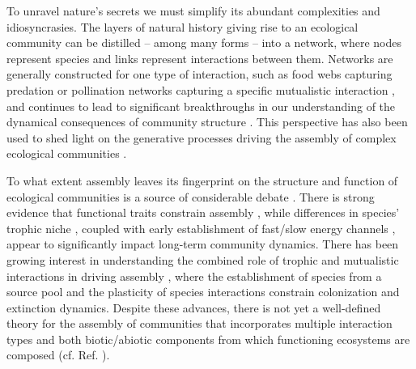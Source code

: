 \documentclass[twocolumn,preprintnumbers,amsmath,amssymb,superscriptaddress,linenumbers]{revtex4-1}
\newcommand{\rev}[1]{\textcolor{crimson}{#1}}
\begin{document}
\begin{bibunit}
To unravel nature's secrets we must simplify its abundant complexities and idiosyncrasies.
The layers of natural history giving rise to an ecological community can be distilled -- among many forms -- into a network, where nodes represent species and links represent interactions between them.
Networks are generally constructed for one type of interaction, such as food webs capturing predation \cite{Paine1966,Dunne2002,Pascual2006} or pollination networks capturing a specific mutualistic interaction \cite{Bascompte2013}, and continues to lead to significant breakthroughs in our understanding of the dynamical consequences of community structure \cite{May1972,Gross2009,Allesina2012}.
This perspective has also been used to shed light on the generative processes driving the assembly of complex ecological communities \cite{Montoya2003,Bascompte2009}.


To what extent assembly leaves its fingerprint on the structure and function of ecological communities is a source of considerable debate \cite{Hubbell2001,Tilman2004,Fukami2015}.
There is strong evidence that functional traits constrain assembly \cite{Kraft2008,ODwyer2009,Fukami2015}, while differences in species' trophic niche \cite{Brown2002,Piechnik2008}, coupled with early establishment of fast/slow energy channels \cite{Fahimipour2014}, appear to significantly impact long-term community dynamics.
There has been growing interest in understanding the combined role of trophic and mutualistic interactions in driving assembly \cite{Barbier2018,Campbell2011}, where the establishment of species from a source pool \cite{Luh1993,Law1996,Campbell2011} and the plasticity of species interactions \cite{Valdovinos2010,RamosJiliberto2012,Valdovinos2016,Ponisio2019} constrain colonization and extinction dynamics.
Despite these advances, there is not yet a well-defined theory for the assembly of communities that incorporates multiple interaction types and both biotic/abiotic components from which functioning ecosystems are composed (cf. Ref. \cite{Odum1969}).


\end{bibunit}
\end{document}
